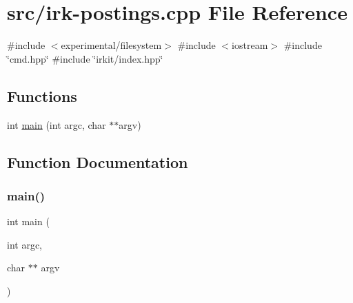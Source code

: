 \hypertarget{irk-postings_8cpp}{}\section{src/irk-\/postings.cpp File Reference}
\label{irk-postings_8cpp}
{\ttfamily \#include $<$experimental/filesystem$>$}\newline
{\ttfamily \#include $<$iostream$>$}\newline
{\ttfamily \#include \char`\"{}cmd.\+hpp\char`\"{}}\newline
{\ttfamily \#include \char`\"{}irkit/index.\+hpp\char`\"{}}\newline
\subsection*{Functions}
\begin{DoxyCompactItemize}
\item 
int \mbox{\hyperlink{irk-postings_8cpp_a3c04138a5bfe5d72780bb7e82a18e627}{main}} (int argc, char $\ast$$\ast$argv)
\end{DoxyCompactItemize}


\subsection{Function Documentation}
\mbox{\label{irk-postings_8cpp_a3c04138a5bfe5d72780bb7e82a18e627}} 
\subsubsection{\texorpdfstring{main()}{main()}}
{\footnotesize\ttfamily int main (\begin{DoxyParamCaption}\item[{int}]{argc,  }\item[{char $\ast$$\ast$}]{argv }\end{DoxyParamCaption})}


